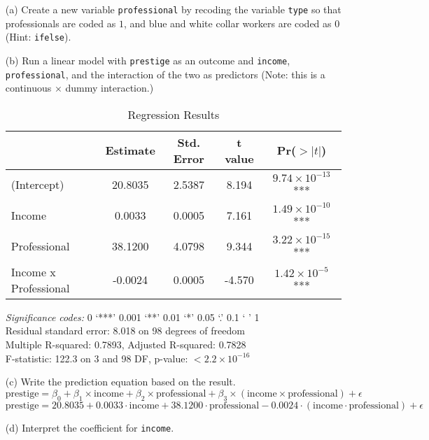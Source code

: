 \documentclass[12pt,letterpaper]{article}
\begin{document}
\newpage
\begin{enumerate}
	
	\item [(a)]
	Create a new variable \texttt{professional} by recoding the variable \texttt{type} so that professionals are coded as $1$, and blue and white collar workers are coded as $0$ (Hint: \texttt{ifelse}).
 
	
	\vspace{6cm}
	
	
	\item [(b)]
	Run a linear model with \texttt{prestige} as an outcome and \texttt{income}, \texttt{professional}, and the interaction of the two as predictors (Note: this is a continuous $\times$ dummy interaction.)



\begin{table}[htbp] 
\centering 
\caption{Regression Results} 
\begin{tabular}{lcccc} 
\hline 
 & Estimate & Std. Error & t value & Pr($>|t|$) \\ 
\hline 
(Intercept) & 20.8035 & 2.5387 & 8.194 & $9.74 \times 10^{-13}$ *** \\ 
Income & 0.0033 & 0.0005 & 7.161 & $1.49 \times 10^{-10}$ *** \\ 
Professional & 38.1200 & 4.0798 & 9.344 & $3.22 \times 10^{-15}$ *** \\ 
Income x Professional & -0.0024 & 0.0005 & -4.570 & $1.42 \times 10^{-5}$ *** \\ 
\hline 
\end{tabular} 
\begin{flushleft}
\textit{Significance codes:} 0 ‘***’ 0.001 ‘**’ 0.01 ‘*’ 0.05 ‘.’ 0.1 ‘ ’ 1 \\
Residual standard error: 8.018 on 98 degrees of freedom \\
Multiple R-squared: 0.7893, Adjusted R-squared: 0.7828 \\
F-statistic: 122.3 on 3 and 98 DF, p-value: $< 2.2 \times 10^{-16}$
\end{flushleft}
\end{table}
	\vspace{6cm}
	\item [(c)]
	Write the prediction equation based on the result.
\[
\text{prestige} = \beta_0 + \beta_1 \times \text{income} + \beta_2 \times \text{professional} + \beta_3 \times (\text{income} \times\text{professional}) + \epsilon
\]
$\text{prestige} = 20.8035 + 0.0033 \cdot \text{income} + 38.1200 \cdot \text{professional} - 0.0024 \cdot (\text{income} \cdot \text{professional}) + \epsilon$
\newpage
	\item [(d)]
	Interpret the coefficient for \texttt{income}.


\end{enumerate}
\end{document}
